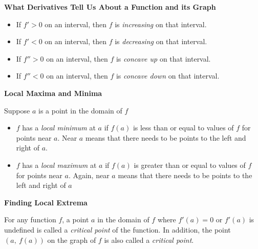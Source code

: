 \documentclass[12pt,addpoints, answers, fleqn]{exam}
\begin{document}
\begin{center}
\textbf{What Derivatives Tell Us About a Function and its Graph}
\end{center}

\begin{itemize}
\item If $f'>0$ on an interval, then $f$ is \emph{increasing} on that interval.
\item If $f'<0$ on an interval, then $f$ is \emph{decreasing} on that interval.
\item If $f''>0$ on an interval, then $f$ is \emph{concave up} on that interval.
\item If $f''<0$ on an interval, then $f$ is \emph{concave down} on that interval.
\end{itemize}




\begin{center}
\textbf{Local Maxima and Minima}
\end{center}

Suppose $a$ is a point in the domain of $f$
\begin{itemize}
\item $f$ has a \emph{local minimum} at $a$ if $f\left(a\right)$ is less than or equal to values of $f$ for points near $a$. Near $a$ means that there needs to be points to the left and right of $a$.
\item $f$ has a \emph{local maximum} at $a$ if $f\left(a\right)$ is greater than or equal to values of $f$ for points near $a$. Again, near $a$ means that there needs to be points to the left and right of $a$
\end{itemize}





\begin{center}
\textbf{Finding Local Extrema}
\end{center}

For any function $f$, a point $a$ in the domain of $f$ where $f'\left(a\right) = 0$ or $f'\left(a\right)$ is undefined is called a \emph{critical point} of the function. In addition, the point $\left( a, \ f\left(a\right)\right)$ on the graph of $f$ is also called a \emph{critical point}.
\end{document}
